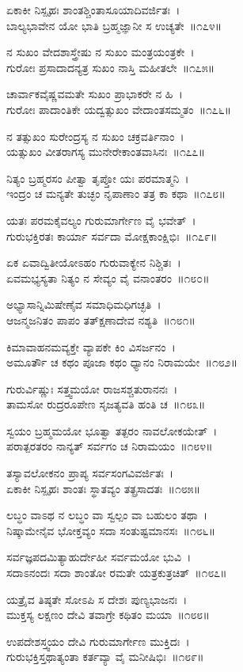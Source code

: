 ಏಕಾಕೀ ನಿಸ್ಪೃಹಃ ಶಾಂತಶ್ಚಿಂತಾಸೂಯಾದಿವರ್ಜಿತಃ~।\\
ಬಾಲ್ಯಭಾವೇನ ಯೋ ಭಾತಿ ಬ್ರಹ್ಮಜ್ಞಾನೀ ಸ ಉಚ್ಯತೇ~॥೧೭೪॥

ನ ಸುಖಂ ವೇದಶಾಸ್ತ್ರೇಷು ನ ಸುಖಂ ಮಂತ್ರಯಂತ್ರಕೇ~।\\
ಗುರೋಃ ಪ್ರಸಾದಾದನ್ಯತ್ರ ಸುಖಂ ನಾಸ್ತಿ ಮಹೀತಲೇ~॥೧೭೫॥

ಚಾರ್ವಾಕವೈಷ್ಣವಮತೇ ಸುಖಂ ಪ್ರಾಭಾಕರೇ ನ ಹಿ~।\\
ಗುರೋಃ ಪಾದಾಂತಿಕೇ ಯದ್ವತ್ಸುಖಂ ವೇದಾಂತಸಮ್ಮತಂ~॥೧೭೬॥

ನ ತತ್ಸುಖಂ ಸುರೇಂದ್ರಸ್ಯ ನ ಸುಖಂ ಚಕ್ರವರ್ತಿನಾಂ~।\\
ಯತ್ಸುಖಂ ವೀತರಾಗಸ್ಯ ಮುನೇರೇಕಾಂತವಾಸಿನಃ~॥೧೭೭॥

ನಿತ್ಯಂ ಬ್ರಹ್ಮರಸಂ ಪೀತ್ವಾ ತೃಪ್ತೋ ಯಃ ಪರಮಾತ್ಮನಿ~।\\
ಇಂದ್ರಂ ಚ ಮನ್ಯತೇ ತುಚ್ಛಂ ನೃಪಾಣಾಂ ತತ್ರ ಕಾ ಕಥಾ~॥೧೭೮॥

ಯತಃ ಪರಮಕೈವಲ್ಯಂ ಗುರುಮಾರ್ಗೇಣ ವೈ ಭವೇತ್~।\\
ಗುರುಭಕ್ತಿರತಃ ಕಾರ್ಯಾ ಸರ್ವದಾ ಮೋಕ್ಷಕಾಂಕ್ಷಿಭಿಃ~॥೧೭೯॥

ಏಕ ಏವಾದ್ವಿತೀಯೋಽಹಂ ಗುರುವಾಕ್ಯೇನ ನಿಶ್ಚಿತಃ~।\\
ಏವಮಭ್ಯಸ್ಯತಾ ನಿತ್ಯಂ ನ ಸೇವ್ಯಂ ವೈ ವನಾಂತರಂ~॥೧೮೦॥

ಅಭ್ಯಾಸಾನ್ನಿಮಿಷೇಣೈವ ಸಮಾಧಿಮಧಿಗಚ್ಛತಿ~।\\
ಆಜನ್ಮಜನಿತಂ ಪಾಪಂ ತತ್ಕ್ಷಣಾದೇವ ನಶ್ಯತಿ~॥೧೮೧॥

ಕಿಮಾವಾಹನಮವ್ಯಕ್ತೇ ವ್ಯಾಪಕೇ ಕಿಂ ವಿಸರ್ಜನಂ~।\\
ಅಮೂರ್ತೌ ಚ ಕಥಂ ಪೂಜಾ ಕಥಂ ಧ್ಯಾನಂ ನಿರಾಮಯೇ~॥೧೮೨॥

ಗುರುರ್ವಿಷ್ಣುಃ ಸತ್ತ್ವಮಯೋ ರಾಜಸಶ್ಚತುರಾನನಃ~।\\
ತಾಮಸೋ ರುದ್ರರೂಪೇಣ ಸೃಜತ್ಯವತಿ ಹಂತಿ ಚ~॥೧೮೩॥

ಸ್ವಯಂ ಬ್ರಹ್ಮಮಯೋ ಭೂತ್ವಾ ತತ್ಪರಂ ನಾವಲೋಕಯೇತ್~।\\
ಪರಾತ್ಪರತರಂ ನಾನ್ಯತ್ ಸರ್ವಗಂ ಚ ನಿರಾಮಯಂ~॥೧೮೪॥

ತಸ್ಯಾವಲೋಕನಂ ಪ್ರಾಪ್ಯ ಸರ್ವಸಂಗವಿವರ್ಜಿತಃ~।\\
ಏಕಾಕೀ ನಿಸ್ಪೃಹಃ ಶಾಂತಃ ಸ್ಥಾತವ್ಯಂ ತತ್ಪ್ರಸಾದತಃ~॥೧೮೫॥

ಲಬ್ಧಂ ವಾಽಥ ನ ಲಬ್ಧಂ ವಾ ಸ್ವಲ್ಪಂ ವಾ ಬಹುಲಂ ತಥಾ~।\\
ನಿಷ್ಕಾಮೇನೈವ ಭೋಕ್ತವ್ಯಂ ಸದಾ ಸಂತುಷ್ಟಮಾನಸಃ~॥೧೮೬॥

ಸರ್ವಜ್ಞಪದಮಿತ್ಯಾಹುರ್ದೇಹೀ ಸರ್ವಮಯೋ ಭುವಿ~।\\
ಸದಾಽನಂದಃ ಸದಾ ಶಾಂತೋ ರಮತೇ ಯತ್ರಕುತ್ರಚಿತ್~॥೧೮೭॥

ಯತ್ರೈವ ತಿಷ್ಠತೇ ಸೋಽಪಿ ಸ ದೇಶಃ ಪುಣ್ಯಭಾಜನಃ~।\\
ಮುಕ್ತಸ್ಯ ಲಕ್ಷಣಂ ದೇವಿ ತವಾಗ್ರೇ ಕಥಿತಂ ಮಯಾ~॥೧೮೮॥

ಉಪದೇಶಸ್ತ್ವಯಂ ದೇವಿ ಗುರುಮಾರ್ಗೇಣ ಮುಕ್ತಿದಃ~।\\
ಗುರುಭಕ್ತಿಸ್ತಥಾತ್ಯಂತಾ ಕರ್ತವ್ಯಾ ವೈ ಮನೀಷಿಭಿಃ~॥೧೮೯॥

